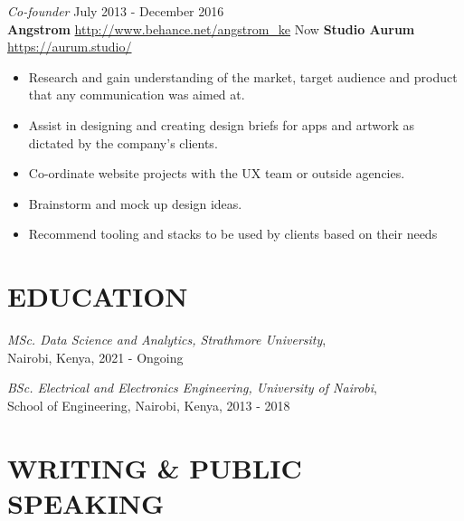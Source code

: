 \documentclass[margin, line]{res} %
\begin{document}
    {\sl Co-founder} \hfill July 2013 - December 2016\\
    \textbf{Angstrom} \hfill \url{http://www.behance.net/angstrom_ke}
    Now \textbf{Studio Aurum} \hfill \url{https://aurum.studio/}
    \begin{itemize} \itemsep -2pt %
    \item Research and gain understanding of the market, target
      audience and product that any communication was aimed at.
    \item Assist in designing and creating design briefs for apps and
      artwork as dictated by the company's clients.
    \item Co-ordinate website projects with the UX team or outside
      agencies.
    \item Brainstorm and mock up design ideas.
    \item Recommend tooling and stacks to be used by clients based on
      their needs
    \end{itemize}

    \section{EDUCATION}

    {\sl MSc. Data Science and Analytics, Strathmore
      University},\\ Nairobi, Kenya, 2021 - Ongoing

    {\sl BSc. Electrical and Electronics Engineering, University of
      Nairobi},\\ School of Engineering, Nairobi, Kenya, 2013 - 2018


    \section{WRITING \& PUBLIC SPEAKING}
\end{document}
